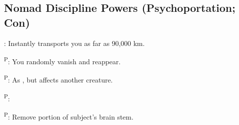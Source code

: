 \subsection{Nomad Discipline Powers {\normalsize(Psychoportation; Con)}}
\begin{enumerate*}
\item
\item
\item
\item
\item {}: Instantly transports you as far as 90,000 km.
\item {}\textsuperscript{P}: You randomly vanish and reappear.

      \textsuperscript{P}: As , but affects another creature.

      \textsuperscript{P}:

\item {}\textsuperscript{P}: Remove portion of subject's brain stem.
\item
\item
\end{enumerate*}



